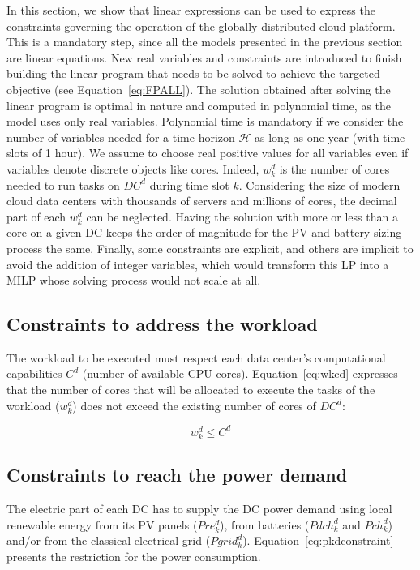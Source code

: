 In this section, we show that linear expressions can be used to express the constraints governing the operation of the globally distributed cloud platform. This is a mandatory step, since all the models presented in the previous section are linear equations. New real variables and constraints are introduced to finish building the linear program that needs to be solved to achieve the targeted objective (see Equation~\eqref{eq:FPALL}). The solution obtained after solving the linear program is optimal in nature and computed in polynomial time, as the model uses only real variables. Polynomial time is mandatory if we consider the number of variables needed for a time horizon $\mathcal{H}$ as long as one year (with time slots of 1 hour). We assume to choose real positive values for all variables even if variables denote discrete objects like cores. Indeed, $w_k^d$ is the number of cores needed to run tasks on $DC^d$ during time slot $k$. Considering the size of modern cloud data centers with thousands of servers and millions of cores, the decimal part of each $w_k^d$ can be neglected. Having the solution with more or less than a core on a given DC keeps the order of magnitude for the PV and battery sizing process the same. Finally, some constraints are explicit, and others are implicit to avoid the addition of integer variables, which would transform this LP into a MILP whose solving process would not scale at all.


\subsection{Constraints to address the workload}

The workload to be executed must respect each data center's computational capabilities $C^d$ (number of available CPU cores). Equation~\eqref{eq:wkcd} expresses that the number of cores that will be allocated to execute the tasks of the workload ($w_k^d$) does not exceed the existing number of cores of $DC^d$:

\begin{equation}\label{eq:wkcd}
    w_k^d \leq C^d
\end{equation}


\subsection{Constraints to reach the power demand}

The electric part of each DC has to supply the DC power demand using local renewable energy from its PV panels ($Pre_k^d$), from batteries ($Pdch_k^d$ and $Pch_k^d$) and/or from the classical electrical grid ($Pgrid_k^d$). Equation~\eqref{eq:pkdconstraint} presents the restriction for the power consumption.

